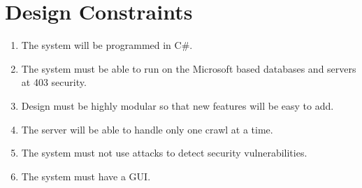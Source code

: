 \section{Design Constraints}
\begin{enumerate}
\item The system will be programmed in C\#.
\item The system must be able to run on the Microsoft based databases and servers at 403 security.
\item Design must be highly modular so that new features will be easy to add.
\item The server will be able to handle only one crawl at a time.
\item The system must not use attacks to detect security vulnerabilities.
\item The system must have a GUI.
\end{enumerate}
